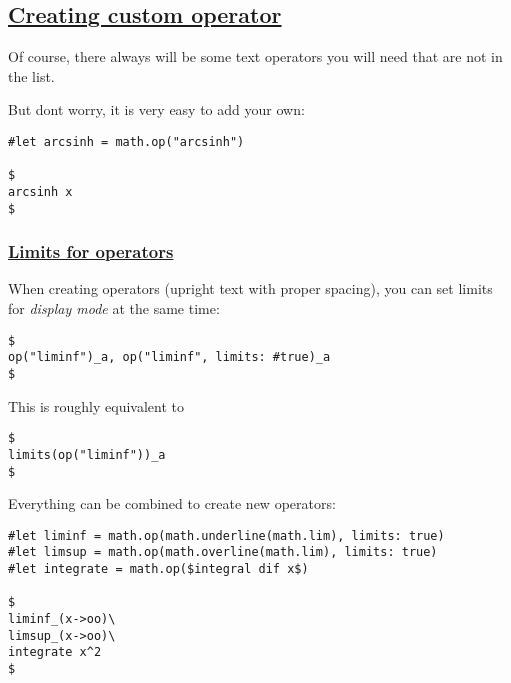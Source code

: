 \subsection{\texorpdfstring{\hyperref[creating-custom-operator]{Creating
custom
operator}}{Creating custom operator}}\label{creating-custom-operator}

Of course, there always will be some text operators you will need that
are not in the list.

But don\textquotesingle t worry, it is very easy to add your own:

\begin{verbatim}
#let arcsinh = math.op("arcsinh")

$
arcsinh x
$
\end{verbatim}

\pandocbounded{}

\subsubsection{\texorpdfstring{\hyperref[limits-for-operators]{Limits
for operators}}{Limits for operators}}\label{limits-for-operators}

When creating operators (upright text with proper spacing), you can set
limits for \emph{display mode} at the same time:

\begin{verbatim}
$
op("liminf")_a, op("liminf", limits: #true)_a
$
\end{verbatim}

\pandocbounded{}

This is roughly equivalent to

\begin{verbatim}
$
limits(op("liminf"))_a
$
\end{verbatim}

\pandocbounded{}

Everything can be combined to create new operators:

\begin{verbatim}
#let liminf = math.op(math.underline(math.lim), limits: true)
#let limsup = math.op(math.overline(math.lim), limits: true)
#let integrate = math.op($integral dif x$)

$
liminf_(x->oo)\
limsup_(x->oo)\
integrate x^2
$
\end{verbatim}

